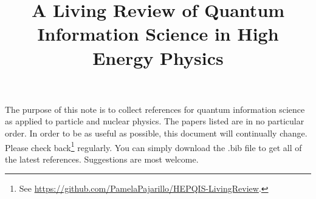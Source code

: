 \documentclass[12pt,letterpaper]{article}
\title{\boldmath A Living Review of Quantum Information Science in High Energy Physics}
\begin{document}
\maketitle
\tableofcontents

The purpose of this note is to collect references for quantum information science as applied to particle and nuclear physics.  The papers listed are in no particular order.  In order to be as useful as possible, this document will continually change. Please check back\footnote[2]{See \href{https://github.com/PamelaPajarillo/HEPQIS-LivingReview}{https://github.com/PamelaPajarillo/HEPQIS-LivingReview}.} regularly.  You can simply download the .bib file to get all of the latest references.  Suggestions are most welcome.





\clearpage
\flushbottom



\end{document}
